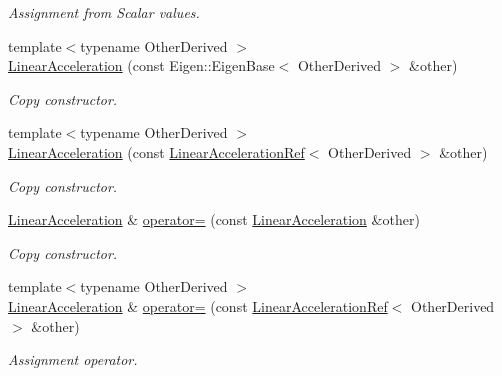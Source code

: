 \begin{DoxyCompactItemize}
\begin{DoxyCompactList}\small\item\em Assignment from Scalar values. \end{DoxyCompactList}\item 
{\footnotesize template$<$typename Other\+Derived $>$ }\\\hyperlink{classow__core_1_1LinearAcceleration_a243335c29a665db0eb2870fa7d41f5eb}{Linear\+Acceleration} (const Eigen\+::\+Eigen\+Base$<$ Other\+Derived $>$ \&other)
\begin{DoxyCompactList}\small\item\em Copy constructor. \end{DoxyCompactList}\item 
{\footnotesize template$<$typename Other\+Derived $>$ }\\\hyperlink{classow__core_1_1LinearAcceleration_a93a64e1eda9e5d891e0248adc3e10f4e}{Linear\+Acceleration} (const \hyperlink{classow__core_1_1LinearAccelerationRef}{Linear\+Acceleration\+Ref}$<$ Other\+Derived $>$ \&other)
\begin{DoxyCompactList}\small\item\em Copy constructor. \end{DoxyCompactList}\item 
\hyperlink{classow__core_1_1LinearAcceleration}{Linear\+Acceleration} \& \hyperlink{classow__core_1_1LinearAcceleration_ab034051be7d20a2c5955df7aca5832f7}{operator=} (const \hyperlink{classow__core_1_1LinearAcceleration}{Linear\+Acceleration} \&other)\hypertarget{classow__core_1_1LinearAcceleration_ab034051be7d20a2c5955df7aca5832f7}{}\label{classow__core_1_1LinearAcceleration_ab034051be7d20a2c5955df7aca5832f7}

\begin{DoxyCompactList}\small\item\em Copy constructor. \end{DoxyCompactList}\item 
{\footnotesize template$<$typename Other\+Derived $>$ }\\\hyperlink{classow__core_1_1LinearAcceleration}{Linear\+Acceleration} \& \hyperlink{classow__core_1_1LinearAcceleration_a7a10354bd8653d307f280b5712d71335}{operator=} (const \hyperlink{classow__core_1_1LinearAccelerationRef}{Linear\+Acceleration\+Ref}$<$ Other\+Derived $>$ \&other)\hypertarget{classow__core_1_1LinearAcceleration_a7a10354bd8653d307f280b5712d71335}{}\label{classow__core_1_1LinearAcceleration_a7a10354bd8653d307f280b5712d71335}

\begin{DoxyCompactList}\small\item\em Assignment operator. \end{DoxyCompactList}\end{DoxyCompactItemize}


